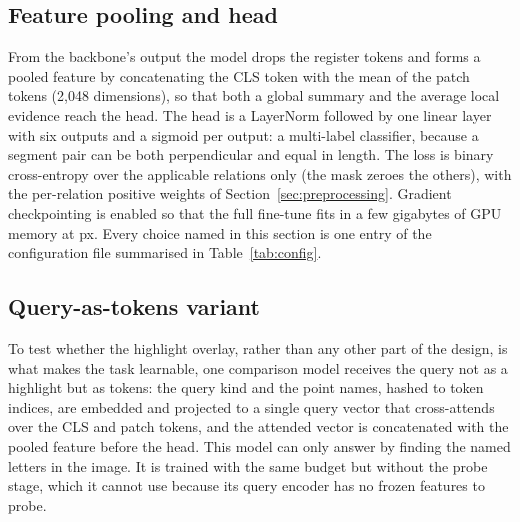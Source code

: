 \subsection{Feature pooling and head}

From the backbone's output the model drops the register tokens and forms a pooled feature by concatenating the CLS token with the mean of the patch tokens (2,048 dimensions), so that both a global summary and the average local evidence reach the head. The head is a LayerNorm followed by one linear layer with six outputs and a sigmoid per output: a multi-label classifier, because a segment pair can be both perpendicular and equal in length. The loss is binary cross-entropy over the applicable relations only (the mask zeroes the others), with the per-relation positive weights of Section~\ref{sec:preprocessing}. Gradient checkpointing \cite{chen2016checkpointing} is enabled so that the full fine-tune fits in a few gigabytes of GPU memory at  px. Every choice named in this section is one entry of the configuration file summarised in Table~\ref{tab:config}.

\subsection{Query-as-tokens variant}

To test whether the highlight overlay, rather than any other part of the design, is what makes the task learnable, one comparison model receives the query not as a highlight but as tokens: the query kind and the point names, hashed to token indices, are embedded and projected to a single query vector that cross-attends over the CLS and patch tokens, and the attended vector is concatenated with the pooled feature before the head. This model can only answer by finding the named letters in the image. It is trained with the same budget but without the probe stage, which it cannot use because its query encoder has no frozen features to probe.
